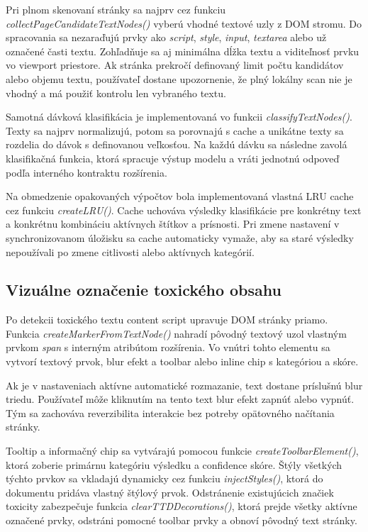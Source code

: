 Pri plnom skenovaní stránky sa najprv cez funkciu \emph{collectPageCandidateTextNodes()} vyberú vhodné textové uzly z DOM stromu. Do spracovania sa nezaraďujú prvky ako \emph{script}, \emph{style}, \emph{input}, \emph{textarea} alebo už označené časti textu. Zohľadňuje sa aj minimálna dĺžka textu a viditeľnosť prvku vo viewport priestore. Ak stránka prekročí definovaný limit počtu kandidátov alebo objemu textu, používateľ dostane upozornenie, že plný lokálny scan nie je vhodný a má použiť kontrolu len vybraného textu.

Samotná dávková klasifikácia je implementovaná vo funkcii \emph{classifyTextNodes()}. Texty sa najprv normalizujú, potom sa porovnajú s cache a unikátne texty sa rozdelia do dávok s definovanou veľkosťou. Na každú dávku sa následne zavolá klasifikačná funkcia, ktorá spracuje výstup modelu a vráti jednotnú odpoveď podľa interného kontraktu rozšírenia.

Na obmedzenie opakovaných výpočtov bola implementovaná vlastná LRU cache cez funkciu \emph{createLRU()}. Cache uchováva výsledky klasifikácie pre konkrétny text a konkrétnu kombináciu aktívnych štítkov a prísnosti. Pri zmene nastavení v synchronizovanom úložisku sa cache automaticky vymaže, aby sa staré výsledky nepoužívali po zmene citlivosti alebo aktívnych kategórií.

\subsection{Vizuálne označenie toxického obsahu}
Po detekcii toxického textu content script upravuje DOM stránky priamo. Funkcia \emph{createMarkerFromTextNode()} nahradí pôvodný textový uzol vlastným prvkom \emph{span} s interným atribútom rozšírenia. Vo vnútri tohto elementu sa vytvorí textový prvok, blur efekt a toolbar alebo inline chip s kategóriou a skóre.

Ak je v nastaveniach aktívne automatické rozmazanie, text dostane príslušnú blur triedu. Používateľ môže kliknutím na tento text blur efekt zapnúť alebo vypnúť. Tým sa zachováva reverzibilita interakcie bez potreby opätovného načítania stránky.

Tooltip a informačný chip sa vytvárajú pomocou funkcie \emph{createToolbarElement()}, ktorá zoberie primárnu kategóriu výsledku a confidence skóre. Štýly všetkých týchto prvkov sa vkladajú dynamicky cez funkciu \emph{injectStyles()}, ktorá do dokumentu pridáva vlastný štýlový prvok. Odstránenie existujúcich značiek toxicity zabezpečuje funkcia \emph{clearTTDDecorations()}, ktorá prejde všetky aktívne označené prvky, odstráni pomocné toolbar prvky a obnoví pôvodný text stránky.

